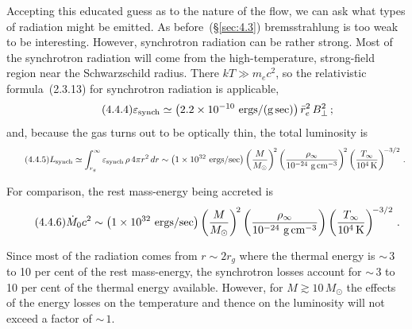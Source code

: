 Accepting this educated guess as to the nature of the flow, we can ask what
types of radiation might be emitted.  As before~(\S\ref{sec:4.3}) bremsstrahlung is too weak
to be interesting.  However, synchrotron radiation can be rather strong.  Most of
the synchrotron radiation will come from the high-temperature, strong-field
region near the Schwarzschild radius.  There $kT \gg m_e c^2$, so the relativistic
formula~(2.3.13) for synchrotron radiation is applicable,
%
\begin{equation}
\tag{4.4.4}
\varepsilon_{\mathrm{synch}}
\simeq \bigl(2.2 \times 10^{-10}~\text{ergs}/(\text{g\,sec})\bigr)\,
  \bar{r}_e^2\, B_\perp^2\,;
\end{equation}
%
and, because the gas turns out to be optically thin, the total luminosity is
%
\begin{equation}
\tag{4.4.5}
L_{\mathrm{synch}}
\simeq \int_{r_g}^{\infty}\varepsilon_{\mathrm{synch}}\,\rho\, 4\pi r^2\, dr
\sim \bigl(1 \times 10^{32}~\text{ergs}/\text{sec}\bigr)
  \left(\frac{M}{M_\odot}\right)^{\!2}
  \left(\frac{\rho_\infty}{10^{-24}~\text{g\,cm}^{-3}}\right)^{\!2}
  \left(\frac{T_\infty}{10^4\,\text{K}}\right)^{\!-3/2}\,.
\end{equation}

For comparison, the rest mass-energy being accreted is
%
\begin{equation}
\tag{4.4.6}
\dot{M}_0 c^2
\sim \bigl(1 \times 10^{32}~\text{ergs}/\text{sec}\bigr)
  \left(\frac{M}{M_\odot}\right)^{\!2}
  \left(\frac{\rho_\infty}{10^{-24}~\text{g\,cm}^{-3}}\right)
  \left(\frac{T_\infty}{10^4\,\text{K}}\right)^{\!-3/2}\,.
\end{equation}

Since most of the radiation comes from $r \sim 2r_g$ where the thermal energy is
${\sim}\,3$ to 10 per cent of the rest mass-energy, the synchrotron losses account for
${\sim}\,3$ to 10 per cent of the thermal energy available.  However,
for $M \gtrsim 10\,M_\odot$ the effects of the energy losses on the temperature and thence
on the luminosity will not exceed a factor of ${\sim}\,1$.

